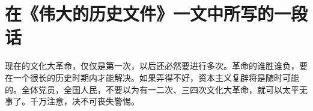 \section[在《伟大的历史文件》一文中所写的一段话（一九六七年五月十八日）]{在《伟大的历史文件》一文中所写的一段话}


现在的文化大革命，仅仅是第一次，以后还必然要进行多次。革命的谁胜谁负，要在一个很长的历史时期内才能解决。如果弄得不好，资本主义复辟将是随时可能的。全体党员，全国人民，不要以为有一二次、三四次文化大革命，就可以太平无事了。千万注意，决不可丧失警惕。

